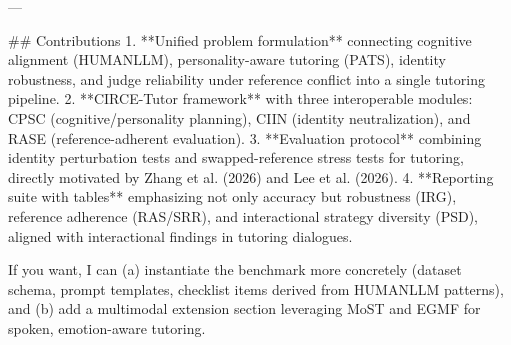 ---

## Contributions  
1. **Unified problem formulation** connecting cognitive alignment (HUMANLLM), personality-aware tutoring (PATS), identity robustness, and judge reliability under reference conflict into a single tutoring pipeline.  
2. **CIRCE-Tutor framework** with three interoperable modules: CPSC (cognitive/personality planning), CIIN (identity neutralization), and RASE (reference-adherent evaluation).  
3. **Evaluation protocol** combining identity perturbation tests and swapped-reference stress tests for tutoring, directly motivated by Zhang et al. (2026) and Lee et al. (2026).  
4. **Reporting suite with tables** emphasizing not only accuracy but robustness (IRG), reference adherence (RAS/SRR), and interactional strategy diversity (PSD), aligned with interactional findings in tutoring dialogues.

If you want, I can (a) instantiate the benchmark more concretely (dataset schema, prompt templates, checklist items derived from HUMANLLM patterns), and (b) add a multimodal extension section leveraging MoST and EGMF for spoken, emotion-aware tutoring.